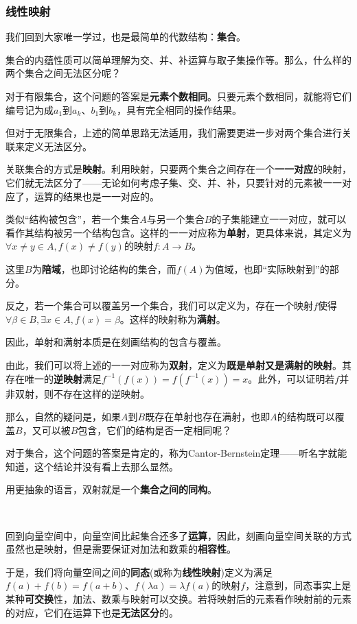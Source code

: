 \documentclass[a4paper,UTF8,fontset=windows]{ctexart}
\newcommand*{\note}{\noindent *}
\begin{document}
\subsubsection{线性映射}
我们回到大家唯一学过，也是最简单的代数结构：\textbf{集合}。

集合的内蕴性质可以简单理解为交、并、补运算与取子集操作等。那么，什么样的两个集合之间无法区分呢？

对于有限集合，这个问题的答案是\textbf{元素个数相同}。只要元素个数相同，就能将它们编号记为成$a_1$到$a_k$、$b_1$到$b_k$，具有完全相同的操作结果。

但对于无限集合，上述的简单思路无法适用，我们需要更进一步对两个集合进行关联来定义无法区分。

关联集合的方式是\textbf{映射}。利用映射，只要两个集合之间存在一个\textbf{一一对应}的映射，它们就无法区分了——无论如何考虑子集、交、并、补，只要针对的元素被一一对应了，运算的结果也是一一对应的。

类似``结构被包含''，若一个集合$A$与另一个集合$B$的子集能建立一一对应，就可以看作其结构被另一个结构包含。这样的一一对应称为\textbf{单射}，更具体来说，其定义为$\forall x\ne y\in A,f(x)\ne f(y)$的映射$f:A\to B$。

\note 这里$B$为\textbf{陪域}，也即讨论结构的集合，而$f(A)$为值域，也即``实际映射到''的部分。

反之，若一个集合可以覆盖另一个集合，我们可以定义为，存在一个映射$f$使得$\forall\beta\in B,\exists x\in A,f(x)=\beta$。这样的映射称为\textbf{满射}。

\note 因此，单射和满射本质是在刻画结构的包含与覆盖。

由此，我们可以将上述的一一对应称为\textbf{双射}，定义为\textbf{既是单射又是满射的映射}。其存在唯一的\textbf{逆映射}满足$f^{-1}(f(x))=f(f^{-1}(x))=x$。此外，可以证明若$f$并非双射，则不存在这样的逆映射。 

那么，自然的疑问是，如果$A$到$B$既存在单射也存在满射，也即$A$的结构既可以覆盖$B$，又可以被$B$包含，它们的结构是否一定相同呢？

对于集合，这个问题的答案是肯定的，称为Cantor-Bernstein定理——听名字就能知道，这个结论并没有看上去那么显然。

用更抽象的语言，双射就是一个\textbf{集合之间的同构}。

\

回到向量空间中，向量空间比起集合还多了\textbf{运算}，因此，刻画向量空间关联的方式虽然也是映射，但是需要保证对加法和数乘的\textbf{相容性}。

于是，我们将向量空间之间的\textbf{同态}(或称为\textbf{线性映射})定义为满足$f(a)+f(b)=f(a+b)$、$f(\lambda a)=\lambda f(a)$的映射$f$，注意到，同态事实上是某种\textbf{可交换}性，加法、数乘与映射可以交换。若将映射后的元素看作映射前的元素的对应，它们在运算下也是\textbf{无法区分}的。
\end{document}
